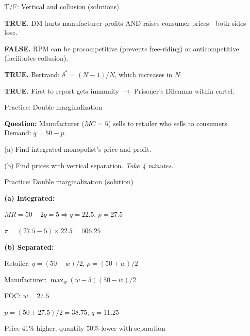 \documentclass[notes,11pt, aspectratio=169]{beamer}
\newenvironment{wideitemize}{\itemize\addtolength{\itemsep}{10pt}}{\enditemize}
\newenvironment{wideenumerate}{\enumerate\addtolength{\itemsep}{10pt}}{\endenumerate}
\begin{document}
\begin{frame}{T/F: Vertical and collusion (solutions)}
	\begin{wideenumerate}
		\item \textbf{TRUE.} DM hurts manufacturer profits AND raises consumer prices---both sides lose.
		\item \textbf{FALSE.} RPM can be procompetitive (prevents free-riding) or anticompetitive (facilitates collusion).
		\item \textbf{TRUE.} Bertrand: $\delta^* = (N-1)/N$, which increases in $N$.
		\item \textbf{TRUE.} First to report gets immunity $\rightarrow$ Prisoner's Dilemma within cartel.
	\end{wideenumerate}
\end{frame}

\begin{frame}{Practice: Double marginalization}
	\begin{wideitemize}
		\item \textbf{Question:} Manufacturer ($MC = 5$) sells to retailer who sells to consumers. Demand: $q = 50 - p$.
		\item (a) Find integrated monopolist's price and profit.
		\item (b) Find prices with vertical separation.
	\end{wideitemize}
	\vspace{10pt}
	\centering
	\textit{Take 4 minutes.}
\end{frame}

\begin{frame}{Practice: Double marginalization (solution)}
	\begin{wideitemize}
		\item \textbf{(a) Integrated:}
		\begin{wideitemize}
			\vspace{3pt}
			\item $MR = 50 - 2q = 5 \Rightarrow q = 22.5$, $p = 27.5$
			\item $\pi = (27.5 - 5) \times 22.5 = 506.25$
		\end{wideitemize}
		\item \textbf{(b) Separated:}
		\begin{wideitemize}
			\vspace{3pt}
			\item Retailer: $q = (50 - w)/2$, $p = (50 + w)/2$
			\item Manufacturer: $\max_w (w - 5)(50 - w)/2$
			\item FOC: $w = 27.5$
			\item $p = (50 + 27.5)/2 = 38.75$, $q = 11.25$
		\end{wideitemize}
		\item Price 41\% higher, quantity 50\% lower with separation
	\end{wideitemize}
\end{frame}
\end{document}
